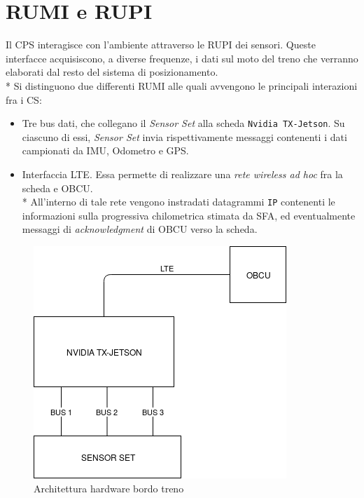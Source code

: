 	\section{RUMI e RUPI}
	Il CPS interagisce con l'ambiente attraverso le RUPI dei sensori. Queste interfacce acquisiscono, a diverse frequenze, i dati sul moto del treno che verranno elaborati dal resto del sistema di posizionamento.\\*
	Si distinguono due differenti RUMI alle quali avvengono le principali interazioni fra i CS:
	\begin{itemize}
		\item Tre bus dati, che collegano il \emph{Sensor Set} alla scheda \texttt{Nvidia TX-Jetson}. Su ciascuno di essi, \emph{Sensor Set} invia rispettivamente messaggi contenenti i dati campionati da IMU, Odometro e GPS.
		\item Interfaccia LTE. Essa permette di realizzare una \emph{rete wireless ad hoc} fra la scheda e OBCU.\\*
		All'interno di tale rete vengono instradati datagrammi \texttt{IP} contenenti le informazioni sulla progressiva chilometrica stimata da SFA, ed eventualmente messaggi di \emph{acknowledgment} di OBCU verso la scheda.
	\end{itemize}
	\begin{figure}[h]
		\centering
		\includegraphics[width=0.7\linewidth]{img/TrainDiagram}
		\caption{Architettura hardware bordo treno}
		\label{fig:tdiagram}
	\end{figure}
